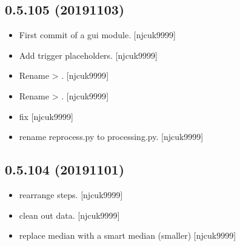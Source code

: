 \documentclass[a4paper,10pt,english]{report}
\begin{document}
\subsection{0.5.105 (2019\sphinxhyphen{}11\sphinxhyphen{}03)}
\label{\detokenize{misc/changelog:id56}}\begin{itemize}
\item {} 
First commit of a gui module. {[}njcuk9999{]}

\item {} 
Add trigger place\sphinxhyphen{}holders. {[}njcuk9999{]}

\item {} 
Rename  \textendash{}\textgreater{} . {[}njcuk9999{]}

\item {} 
Rename  \textendash{}\textgreater{} . {[}njcuk9999{]}

\item {} 
 \sphinxhyphen{} fix  {[}njcuk9999{]}

\item {} 
 \sphinxhyphen{} rename reprocess.py
to processing.py. {[}njcuk9999{]}

\end{itemize}


\subsection{0.5.104 (2019\sphinxhyphen{}11\sphinxhyphen{}01)}
\label{\detokenize{misc/changelog:id57}}\begin{itemize}
\item {} 
 \sphinxhyphen{} rearrange steps. {[}njcuk9999{]}

\item {} 
 \sphinxhyphen{} clean out data. {[}njcuk9999{]}

\item {} 
 \sphinxhyphen{} replace median with a smart median (smaller)
{[}njcuk9999{]}

\end{itemize}
\end{document}
